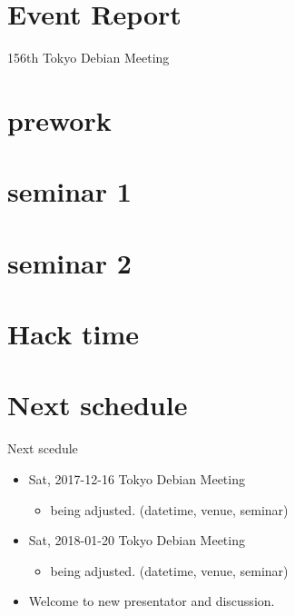 \section{Event Report}

\begin{frame}{156th Tokyo Debian Meeting}
\end{frame}


\section{prework}
{\footnotesize
 
}

%

\section{seminar 1}

\section{seminar 2}

\section{Hack time}

\section{Next schedule}
\begin{frame}{Next scedule}
  \begin{itemize}
  \item Sat, 2017-12-16 Tokyo Debian Meeting
    \begin{itemize}
    \item being adjusted. (datetime, venue, seminar)
    \end{itemize}
  \item Sat, 2018-01-20 Tokyo Debian Meeting
    \begin{itemize}
    \item being adjusted. (datetime, venue, seminar)
    \end{itemize}    
  \item Welcome to new presentator and discussion.
  \end{itemize}
\end{frame}



